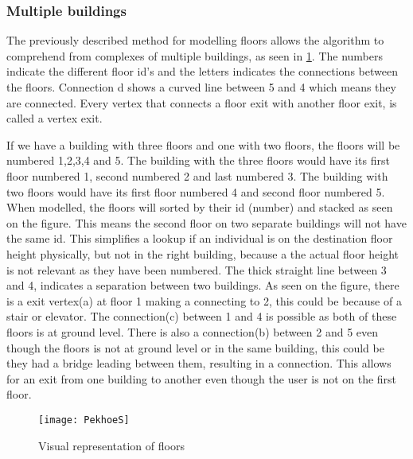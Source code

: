 \subsubsection{Multiple buildings}

The previously described method for modelling floors allows the algorithm to comprehend from complexes of multiple buildings, as seen in \cref{fig:PekhoeS}. The numbers indicate the different floor id's and the letters indicates the connections between the floors. Connection d shows a curved line between 5 and 4 which means they are connected. Every vertex that connects a floor exit with another floor exit, is called a vertex exit\label{e_vertex}. \newline

If we have a building with three floors and one with two floors, the floors will be numbered 1,2,3,4 and 5. The building with the three floors would have its first floor numbered 1, second numbered 2 and last numbered 3. The building with two floors would have its first floor numbered 4 and second floor numbered 5. When modelled, the floors will sorted by their id (number) and stacked as seen on the figure. This means the second floor on two separate buildings will not have the same id. This simplifies a lookup if an individual is on the destination floor height physically, but not in the right building, because a the actual floor height is not relevant as they have been numbered. The thick straight line between 3 and 4, indicates a separation between two buildings. As seen on the figure, there is a exit vertex(a) at floor 1 making a connecting to 2, this could be because of a stair or elevator. The connection(c) between 1 and 4 is possible as both of these floors is at ground level. There is also a connection(b) between 2 and 5 even though the floors is not at ground level or in the same building, this could be they had a bridge leading between them, resulting in a connection. This allows for an exit from one building to another even though the user is not on the first floor. 
\begin{figure}[ht!]
    \centering
    \texttt{[image: PekhoeS]}
    \caption{Visual representation of floors}
    \label{fig:PekhoeS}
  \end{figure}
